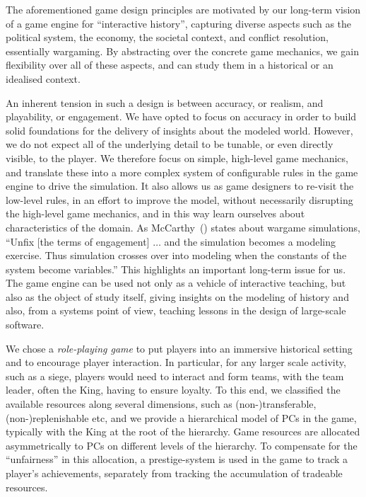 \documentclass[11pt]{article}
\begin{document}
The aforementioned game design principles are motivated by our long-term vision of
a game engine for ``interactive history'', capturing diverse
aspects such as the political system, the economy, the societal context, and
conflict resolution, essentially wargaming.
By abstracting over the concrete game mechanics, we gain flexibility over all 
of these aspects, and can study them in a historical or an idealised context.
%

An inherent tension in such a design is between accuracy, or realism, and playability, or engagement.
We have opted to focus on accuracy in order to build solid foundations for the delivery
of insights about the modeled world. However, we do not expect all of the underlying detail
to be tunable, or even directly visible, to the player. We therefore focus on simple,
high-level game mechanics, and translate these into a more complex system of configurable rules 
in the game engine to drive the simulation. 
It also allows us as game designers to re-visit the low-level rules, in an effort to
improve the model, without necessarily disrupting the high-level game mechanics, and
in this way learn ourselves about characteristics of the domain. As McCarthy~(\cite*{McCarthy}) states about wargame simulations,
``Unfix [the terms of engagement] $\ldots$ and the simulation becomes a modeling exercise.
Thus simulation crosses over into modeling when the constants of the system become variables.''
This highlights an important long-term issue for us. The game engine can be used not only as a vehicle of interactive teaching, 
but also as the object of study itself, giving insights on the modeling of history
and also, from a systems point of view, teaching lessons in the design of large-scale software.

We chose a \emph{role-playing game\/}  to put players into an immersive historical setting and to encourage player interaction.
In particular, for any larger scale activity, such as a siege, players would need to interact
and form teams, with the team leader, often the King, having to ensure loyalty.
To this end, we classified the available resources along several dimensions,
such as (non-)transferable, (non-)replenishable etc, and we provide a hierarchical
model of PCs in the game, typically with the King at the root of the hierarchy.
Game resources are allocated asymmetrically to PCs on different levels of the
hierarchy. To compensate for the ``unfairness'' in this allocation, a prestige-system
is used in the game to track a player's achievements, separately from tracking
the accumulation of tradeable resources.
\end{document}
